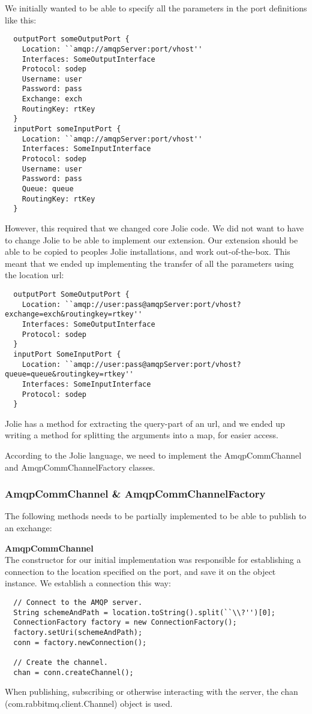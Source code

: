 We initially wanted to be able to specify all the parameters in the port definitions like this:

\begin{lstlisting}
  outputPort someOutputPort {
    Location: ``amqp://amqpServer:port/vhost''
    Interfaces: SomeOutputInterface
    Protocol: sodep
    Username: user
    Password: pass
    Exchange: exch
    RoutingKey: rtKey
  }
  inputPort someInputPort {
    Location: ``amqp://amqpServer:port/vhost''
    Interfaces: SomeInputInterface
    Protocol: sodep
    Username: user
    Password: pass
    Queue: queue
    RoutingKey: rtKey
  }
\end{lstlisting}
However, this required that we changed core Jolie code. We did not want to have to change Jolie to be able to implement our extension. Our extension should be able to be copied to peoples Jolie installations, and work out-of-the-box. This meant that we ended up implementing the transfer of all the parameters using the location url:

\begin{lstlisting}
  outputPort SomeOutputPort {
    Location: ``amqp://user:pass@amqpServer:port/vhost?exchange=exch&routingkey=rtkey''
    Interfaces: SomeOutputInterface
    Protocol: sodep
  }
  inputPort SomeInputPort {
    Location: ``amqp://user:pass@amqpServer:port/vhost?queue=queue&routingkey=rtkey''
    Interfaces: SomeInputInterface
    Protocol: sodep
  }
\end{lstlisting}
Jolie has a method for extracting the query-part of an url, and we ended up writing a method for splitting the arguments into a map, for easier access.

According to the Jolie language, we need to implement the AmqpCommChannel and AmqpCommChannelFactory classes.
\subsubsection{AmqpCommChannel \& AmqpCommChannelFactory}
The following methods needs to be partially implemented to be able to publish to an exchange:

\noindent\textbf{AmqpCommChannel}\\
The constructor for our initial implementation was responsible for establishing a connection to the location specified on the port, and save it on the object instance. We establish a connection this way:
\begin{lstlisting}
  // Connect to the AMQP server.
  String schemeAndPath = location.toString().split(``\\?'')[0];
  ConnectionFactory factory = new ConnectionFactory();
  factory.setUri(schemeAndPath);
  conn = factory.newConnection();

  // Create the channel.
  chan = conn.createChannel();
\end{lstlisting}
When publishing, subscribing or otherwise interacting with the server, the chan (com.rabbitmq.client.Channel) object is used.

